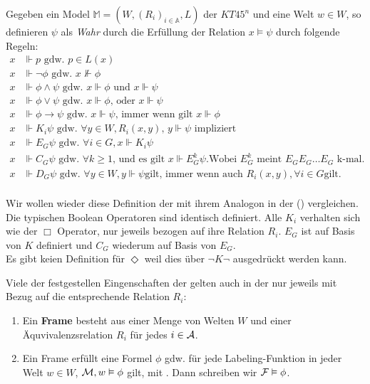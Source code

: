 \begin{definition}
		Gegeben ein Model $\mathds{M} = (W,(R_i)_{i \in \mathds{A}}, L)$ der $KT45^n$ und eine Welt $w \in W$, so definieren $\psi$ als \emph{Wahr} durch die Erfüllung der Relation $x \vDash \psi$ durch folgende Regeln:
		\begin{align}
			x &\Vdash p\text{ gdw. }p \in L(x)\\
			x &\Vdash \neg \phi\text{ gdw. }x \nVdash \phi\\
			x &\Vdash \phi \wedge \psi\text{ gdw. }x \Vdash \phi\text{ und } x \Vdash \psi\\
			x &\Vdash \phi \vee \psi\text{ gdw. }x \Vdash \phi \text{, oder } x \Vdash \psi\\
			x &\Vdash \phi \rightarrow \psi\text{ gdw. }x \Vdash \psi\text{, immer wenn gilt }x \Vdash \phi\\
			x &\Vdash K_i\psi \text{ gdw. } \forall y \in W, R_i(x,y) \text{, } y \Vdash \psi \text{ impliziert}\\
			x &\Vdash E_G\psi \text{ gdw. } \forall i \in G, x \Vdash K_i\psi\\
			x &\Vdash C_G\psi \text{ gdw. } \forall k \geq 1 \text{, und es gilt } x \Vdash E^k_G\psi \text{.} \text{Wobei } E^k_G \text{ meint } E_{G}E_{G}\dots E_{G} \text{ k-mal.}\\
			x &\Vdash D_G\psi \text{ gdw. } \forall y \in W, y \Vdash \psi \text{gilt, immer wenn auch } R_i(x,y), \forall i \in G \text{gilt.}\\
		\end{align}
		\cite[S.337]{huth2004logic}
\end{definition}

Wir wollen wieder diese Definition der \MML mit ihrem Analogon in der \ML () vergleichen.
Die typischen Boolean Operatoren sind identisch definiert.
Alle $K_i$ verhalten sich wie der $\Box$ Operator, nur jeweils bezogen auf ihre Relation $R_i$.
$E_G$ ist auf Basis von $K$ definiert und $C_G$ wiederum auf Basis von $E_G$.\\
Es gibt keien Definition für $\Diamond$ weil dies über $\neg K \neg$ ausgedrückt werden kann.

Viele der festgestellen Eingenschaften der \ML gelten auch in der \MML nur jeweils mit Bezug auf die entsprechende Relation $R_i$:
\begin{enumerate}
	\item Ein \textbf{Frame} \MMFrameDef besteht aus einer Menge von Welten $W$ und einer Äquvivalenzsrelation $R_i$ für jedes $i \in \mathcal{A}$.
	\item Ein Frame \MMFrameDef erfüllt eine Formel $\phi$ gdw. für jede Labeling-Funktion \LabelFuncDef in jeder Welt $w \in W$, $\mathcal{M}, w \vDash \phi$ gilt, mit \MMModelDef. Dann schreiben wir $\mathcal{F} \vDash \phi$.
\end{enumerate}

